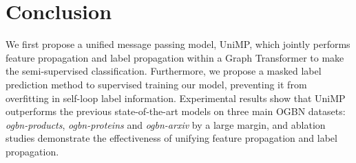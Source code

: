 \documentclass{article} \usepackage{iclr2021_conference,times}
\begin{document}
 

\section{Conclusion}
We first propose a unified message passing model, UniMP, which jointly performs feature propagation and label propagation within a Graph Transformer to make the semi-supervised classification. Furthermore, we propose a masked label prediction method to supervised training our model, preventing it from overfitting in self-loop label information. Experimental results show that UniMP outperforms the previous state-of-the-art models on three main OGBN datasets: \emph{ogbn-products}, \emph{ogbn-proteins} and \emph{ogbn-arxiv} by a large margin, and ablation studies demonstrate the effectiveness of unifying feature propagation and label propagation. 




\newpage


\end{document}
